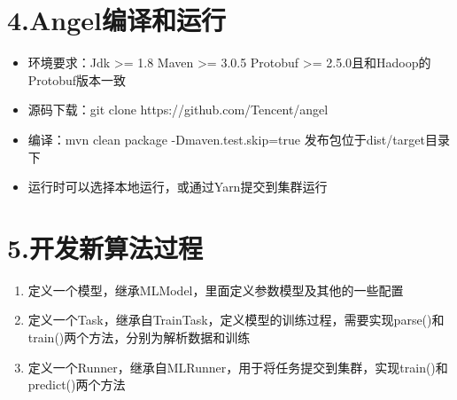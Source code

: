 \documentclass{article}
\begin{document}
\section{4.\hspace*{0.5em}Angel编译和运行}\label{sec-angel}%

\begin{itemize}[noitemsep,topsep=\mdcompacttopsep]%

\item{}环境要求：Jdk \textgreater{}= 1.8 Maven \textgreater{}= 3.0.5 Protobuf \textgreater{}= 2.5.0且和Hadoop的Protobuf版本一致%

\item{}源码下载：git clone https://github.com/Tencent/angel%

\item{}编译：mvn clean package -Dmaven.test.skip=true  发布包位于dist/target目录下%

\item{}运行时可以选择本地运行，或通过Yarn提交到集群运行%
\end{itemize}%

\section{5.\hspace*{0.5em}开发新算法过程}\label{section}%

\begin{enumerate}[noitemsep,topsep=\mdcompacttopsep]%

\item{}定义一个模型，继承MLModel，里面定义参数模型及其他的一些配置%

\item{}定义一个Task，继承自TrainTask，定义模型的训练过程，需要实现parse()和train()两个方法，分别为解析数据和训练%

\item{}定义一个Runner，继承自MLRunner，用于将任务提交到集群，实现train()和predict()两个方法%
\end{enumerate}%
\end{document}
